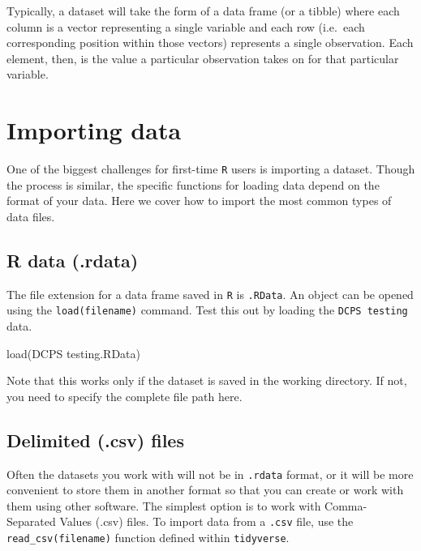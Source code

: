 \documentclass[
  12pt,
]{krantz}
\newenvironment{Shaded}{\begin{snugshade}}{\end{snugshade}}
\newcommand{\FunctionTok}[1]{\textcolor[rgb]{0.00,0.00,0.00}{#1}}
\newcommand{\NormalTok}[1]{#1}
\newcommand{\StringTok}[1]{\textcolor[rgb]{0.31,0.60,0.02}{#1}}
\begin{document}
Typically, a dataset will take the form of a data frame (or a tibble) where each column is a vector representing a single variable and each row (i.e.~each corresponding position within those vectors) represents a single observation. Each element, then, is the value a particular observation takes on for that particular variable.

\hypertarget{importing-data}{%
\section{Importing data}\label{importing-data}}

One of the biggest challenges for first-time \texttt{R} users is importing a dataset. Though the process is similar, the specific functions for loading data depend on the format of your data. Here we cover how to import the most common types of data files.

\hypertarget{r-data-.rdata}{%
\subsection{R data (.rdata)}\label{r-data-.rdata}}

The file extension for a data frame saved in \texttt{R} is \texttt{.RData}. An object can be opened using the \texttt{load(\textquotesingle{}filename\textquotesingle{})} command. Test this out by loading the \texttt{DCPS\ testing} data.

\begin{Shaded}
\begin{Highlighting}[]
  \FunctionTok{load}\NormalTok{(}\StringTok{\textquotesingle{}DCPS testing.RData\textquotesingle{}}\NormalTok{)}
\end{Highlighting}
\end{Shaded}

Note that this works only if the dataset is saved in the working directory. If not, you need to specify the complete file path here.

\hypertarget{delimited-.csv-files}{%
\subsection{Delimited (.csv) files}\label{delimited-.csv-files}}

Often the datasets you work with will not be in \texttt{.rdata} format, or it will be more convenient to store them in another format so that you can create or work with them using other software. The simplest option is to work with Comma-Separated Values (.csv) files. To import data from a \texttt{.csv} file, use the \texttt{read\_csv(\textquotesingle{}filename\textquotesingle{})} function defined within \texttt{tidyverse}.
\end{document}
